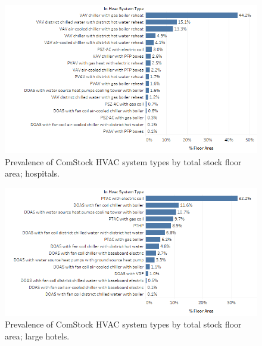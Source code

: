 \begin{figure}
    \centering \includegraphics[width=1.0\textwidth]{figures/HVAC_SYS_Type_PREV_HOS.png}
    \caption[HVAC system type prevalence in hospitals]{Prevalence of ComStock HVAC system types by total stock floor area; hospitals.}
    \label{fig:hvac_sys_type_prevalence_hos}
\end{figure}

\begin{figure}
  \centering \includegraphics[width=1.0\textwidth]{figures/HVAC_SYS_Type_PREV_LrgHotel.png}
  \caption[HVAC system type prevalence in large hotels]{Prevalence of ComStock HVAC system types by total stock floor area; large hotels.}
  \label{fig:HVAC_SYS_Type_PREV_LrgHotel}
\end{figure}

